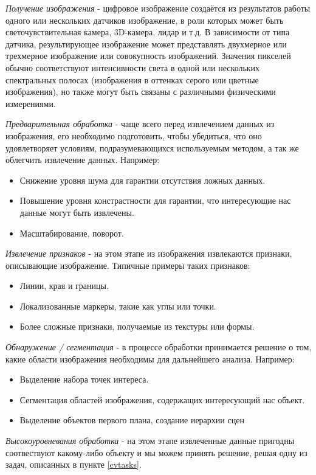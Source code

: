 \documentclass[times]{itmo-student-thesis}
\begin{document}
\textit{Получение изображения} - цифровое изображение создаётся из результатов работы одного или нескольких датчиков изображение, в роли которых может быть светочувствительная камера, 3D-камера, лидар и т.д.  В зависимости от типа датчика, результирующее изображение может представлять  двухмерное или трехмерное изображение или совокупность изображений. Значения пикселей обычно соответствуют интенсивности света в одной или нескольких спектральных полосах (изображения в оттенках серого или цветные изображения), но также могут быть связаны с различными физическими измерениями. 

\textit{Предварительная обработка} - чаще всего перед извлечением данных из изображения, его необходимо подготовить, чтобы убедиться, что оно удовлетворяет условиям, подразумевающихся используемым методом, а так же облегчить извлечение данных. Например:
\begin{itemize}
	\item  Снижение уровня шума для гарантии отсутствия ложных данных.
	\item Повышение уровня констрастности для гарантии, что интересующие нас данные могут быть извлечены.
	\item Масштабирование, поворот.
\end{itemize}

\textit{Извлечение признаков }-  на этом этапе из изображения извлекаются признаки, описывающие изображение. 
Типичные примеры таких признаков:
\begin{itemize}
	\item  Линии, края и границы.
	\item Локализованные маркеры, такие как углы или точки.
	\item Более сложные признаки, получаемые из текстуры или формы. 
\end{itemize}

\textit{Обнаружение / сегментация} - в процессе обработки принимается решение о том, какие области изображения необходимы для дальнейшего анализа. Например:
\begin{itemize}
	\item  Выделение набора точек интереса.
	\item Сегментация областей изображения, содержащих интересующий нас объект.
	\item Выделение объектов первого плана, создание иерархии сцен
\end{itemize}

\textit{Высокоуровневания обработка} - на этом этапе извлеченные данные пригодны соотвествуют какому-либо объекту и мы можем принять решение, решая одну из задач, описанных  в пункте \ref{cvtasks}.
\end{document}
